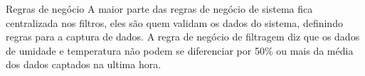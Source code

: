 \documentclass[aspectratio=43]{beamer}
\begin{document}
\begin{frame}{Regras de negócio}
A maior parte das regras de negócio de sistema fica centralizada nos filtros, eles são quem validam os dados do sistema, definindo regras para a captura de dados.
A regra de negócio de filtragem diz que os dados de umidade e temperatura não podem se diferenciar por 50\% ou mais da média dos dados captados na ultima hora.
\end{frame}


% 

\end{document}
